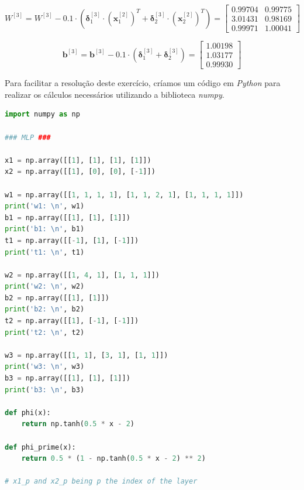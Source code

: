 \documentclass[a4paper,12pt]{article} %
\begin{document}
\begin{enumerate}
\begin{equation*}
    W^{[3]} = W^{[3]} - 0.1 \cdot (\bm{\delta}^{[3]}_1 \cdot (\textbf{x}^{[2]}_1)^T + \bm{\delta}^{[3]}_2 \cdot (\textbf{x}^{[2]}_2)^T) = \begin{bmatrix} 0.99704 & 0.99775 \\
                                                                                                                            3.01431 & 0.98169 \\
                                                                                                                            0.99971 & 1.00041 \end{bmatrix}
\end{equation*}

\begin{equation*}
    \textbf{b}^{[3]} = \textbf{b}^{[3]} - 0.1 \cdot (\bm{\delta}^{[3]}_1 + \bm{\delta}^{[3]}_2) = \begin{bmatrix} 1.00198 \\ 1.03177 \\ 0.99930 \end{bmatrix}
\end{equation*}

Para facilitar a resolução deste exercício, críamos um código em \textit{Python} para 
realizar os cálculos necessários utilizando a biblioteca \textit{numpy}.\\

\begin{lstlisting}[language=Python]
import numpy as np 

### MLP ###

x1 = np.array([[1], [1], [1], [1]])
x2 = np.array([[1], [0], [0], [-1]])

w1 = np.array([[1, 1, 1, 1], [1, 1, 2, 1], [1, 1, 1, 1]])
print('w1: \n', w1)
b1 = np.array([[1], [1], [1]])
print('b1: \n', b1)
t1 = np.array([[-1], [1], [-1]])
print('t1: \n', t1)

w2 = np.array([[1, 4, 1], [1, 1, 1]])
print('w2: \n', w2)
b2 = np.array([[1], [1]])
print('b2: \n', b2)
t2 = np.array([[1], [-1], [-1]])
print('t2: \n', t2)

w3 = np.array([[1, 1], [3, 1], [1, 1]])
print('w3: \n', w3)
b3 = np.array([[1], [1], [1]])
print('b3: \n', b3)

def phi(x):
    return np.tanh(0.5 * x - 2)

def phi_prime(x):
    return 0.5 * (1 - np.tanh(0.5 * x - 2) ** 2)

# x1_p and x2_p being p the index of the layer


\end{lstlisting}
\end{enumerate}
\end{document}
